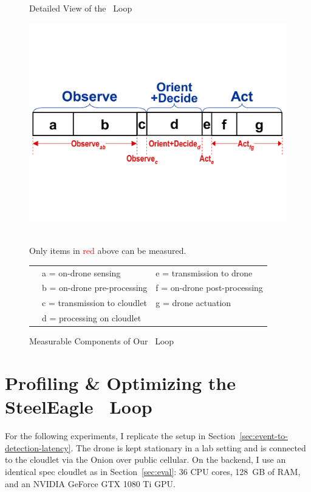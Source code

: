 \begin{figure}
	\caption{Detailed View of the \ooda~Loop}
	\label{fig:ooda-loop}
	\vspace{0.2in}
	\centering
	\includegraphics[width=0.8\linewidth]{chapter5/FIGS/fig-ooda-nomenclature.pdf}
	\begin{captext}
		\centering \\[0.1cm] Only items in \textcolor{red}{red} above can be measured.
		\flushleft
		\begin{tabular}{lll}
			\phantom{00} & a = on-drone sensing & e = transmission to drone\\
			\phantom{00} & b = on-drone pre-processing & f = on-drone post-processing\\
			\phantom{00} & c = transmission to cloudlet & g = drone actuation\\
			\phantom{00} & d = processing on cloudlet\\
		\end{tabular}
	\end{captext}
	\caption{Measurable Components of Our \ooda~Loop}
	\label{fig:nomenclature}

\end{figure}

\section{Profiling \& Optimizing the SteelEagle \ooda~Loop}
\label{sec:e2e-latency}

For the following experiments, I replicate the setup in Section~\ref{sec:event-to-detection-latency}. The drone is kept stationary in a lab setting and is connected to the cloudlet via the Onion over public cellular. On the backend, I use an identical spec cloudlet as in Section~\ref{sec:eval}: 36 CPU cores, 128~GB of RAM, and an NVIDIA GeForce GTX 1080 Ti GPU. 

